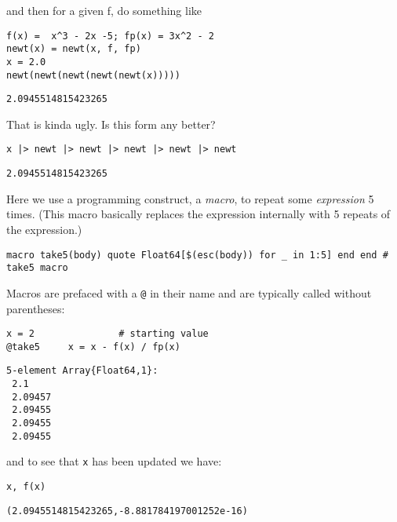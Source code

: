\documentclass[12pt]{article}
\begin{document}
\newline
and then for a given f, do something like\begin{verbatim}
f(x) =  x^3 - 2x -5; fp(x) = 3x^2 - 2
newt(x) = newt(x, f, fp)
x = 2.0
newt(newt(newt(newt(newt(x)))))
\end{verbatim}
\begin{verbatim}
2.0945514815423265\end{verbatim}
\newline
That is kinda ugly. Is this form any better?\begin{verbatim}
x |> newt |> newt |> newt |> newt |> newt
\end{verbatim}
\begin{verbatim}
2.0945514815423265\end{verbatim}
\newline
Here we use a programming construct, a \textit{macro}, to repeat some \textit{expression} 5 times. (This macro basically replaces the expression internally with 5 repeats of the expression.)\begin{verbatim}
macro take5(body) quote Float64[$(esc(body)) for _ in 1:5] end end # take5 macro
\end{verbatim}
\newline
Macros are prefaced with a \texttt{@} in their name and are typically called without parentheses:\begin{verbatim}
x = 2				# starting value
@take5     x = x - f(x) / fp(x)
\end{verbatim}
\begin{verbatim}
5-element Array{Float64,1}:
 2.1    
 2.09457
 2.09455
 2.09455
 2.09455\end{verbatim}
\newline
and to see that \texttt{x} has been updated we have:\begin{verbatim}
x, f(x)
\end{verbatim}
\begin{verbatim}
(2.0945514815423265,-8.881784197001252e-16)\end{verbatim}
\end{document}
